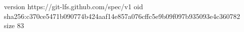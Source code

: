 version https://git-lfs.github.com/spec/v1
oid sha256:c370ce5471b090774b424aaf14e857a076cffc5e9b09f097b935093e4c360782
size 83
